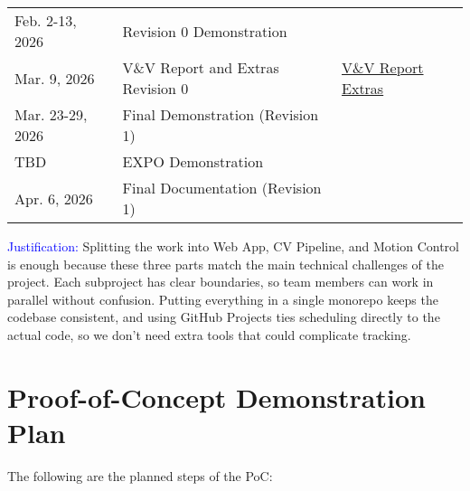 \documentclass{article}
\begin{document}
\begin{table}[h]
\begin{tabularx}{\textwidth}{llX}
    Feb. 2-13, 2026  & Revision 0 Demonstration                      &                                                                                                                                                  \\
    Mar. 9, 2026     & V\&V Report and Extras Revision 0             & \href{https://github.com/ZifanSi/vision-guided-tracker/blob/main/docs/VnVReport/VnVReport.pdf}{V\&V Report}   \newline
    \href{https://github.com/ZifanSi/vision-guided-tracker/tree/main/docs/Extras}{Extras}
    \\
    Mar. 23-29, 2026 & Final Demonstration (Revision 1)              &                                                                                                                                                  \\
    TBD              & EXPO Demonstration                            &                                                                                                                                                  \\
    Apr. 6, 2026     & Final Documentation (Revision 1)              &                                                                                                                                                  \\
    \bottomrule
  \end{tabularx}
\end{table}
\FloatBarrier

\textcolor{blue}{Justification:} Splitting the work into Web App, CV Pipeline,
and Motion Control is enough because these three parts match the main technical
challenges of the project. Each subproject has clear boundaries, so team members
can work in parallel without confusion. Putting everything in a single monorepo
keeps the codebase consistent, and using GitHub Projects ties scheduling directly
to the actual code, so we don’t need extra tools that could complicate tracking.


\section{Proof-of-Concept Demonstration Plan}

The following are the planned steps of the PoC:
\end{document}
